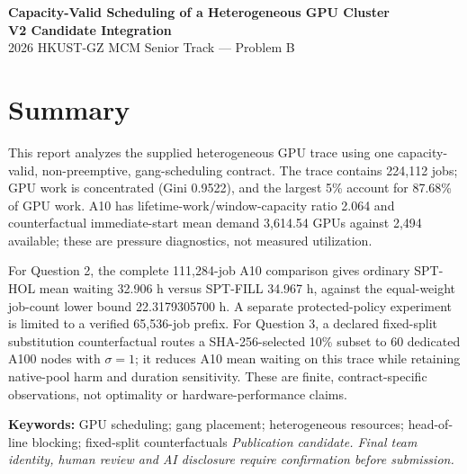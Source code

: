 
\usepackage{lastpage}

\begin{titlepage}
\thispagestyle{fancy}
\begin{center}
\vspace*{0.35in}
{\LARGE\bfseries\color{primary} Capacity-Valid Scheduling of a Heterogeneous GPU Cluster\\V2 Candidate Integration}\\[8pt]
{\large 2026 HKUST-GZ MCM Senior Track --- Problem B}\\[18pt]
\end{center}
\section*{Summary}
This report analyzes the supplied heterogeneous GPU trace using one capacity-valid, non-preemptive, gang-scheduling contract. The trace contains 224,112 jobs; GPU work is concentrated (Gini 0.9522), and the largest 5\% account for 87.68\% of GPU work. A10 has lifetime-work/window-capacity ratio 2.064 and counterfactual immediate-start mean demand 3,614.54 GPUs against 2,494 available; these are pressure diagnostics, not measured utilization.

For Question 2, the complete 111,284-job A10 comparison gives ordinary SPT-HOL mean waiting 32.906 h versus SPT-FILL 34.967 h, against the equal-weight job-count lower bound 22.3179305700 h. A separate protected-policy experiment is limited to a verified 65,536-job prefix. For Question 3, a declared fixed-split substitution counterfactual routes a SHA-256-selected 10\% subset to 60 dedicated A100 nodes with $\sigma=1$; it reduces A10 mean waiting on this trace while retaining native-pool harm and duration sensitivity. These are finite, contract-specific observations, not optimality or hardware-performance claims.

\textbf{Keywords:} GPU scheduling; gang placement; heterogeneous resources; head-of-line blocking; fixed-split counterfactuals
\vfill
\textit{Publication candidate. Final team identity, human review and AI disclosure require confirmation before submission.}
\end{titlepage}
\setcounter{page}{2}



